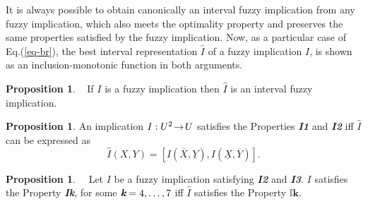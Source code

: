 \documentclass[conference]{IEEEtran}
\theoremstyle{plain}
\theoremstyle{remark}
\theoremstyle{definition}
\theoremstyle{proposition}
\newtheorem{proposition}[theorem]{Proposition}
\newcommand{\lra}{\hspace{-0.05cm}\rightarrow\hspace{-0.05cm}}
\newcommand{\II}{\mathbb{I} }
\begin{document}
It is always possible to obtain canonically an interval fuzzy implication from any fuzzy implication, which also meets the optimality property and preserves the same properties satisfied by the fuzzy
implication. Now, as a particular case of Eq.(\ref{eq-br}), the best interval representation $\widehat{I}$ of a fuzzy implication $I$, is shown as an inclusion-monotonic function in both arguments.

\begin{proposition}~\cite[Prop.~16]{Bed10b}
If $I$ is a fuzzy implication then $\widehat{I}$ is an interval
fuzzy implication.
\end{proposition}

\begin{proposition}\cite[Prop.~21]{Bed10b}\label{pro-char-cirI}
An implication $I: U^2 \lra U$ satisfies the Properties \emph{\textbf{I1}} and \emph{\textbf{I2}} iff $\widehat{I}$ can be expressed as\vspace{-0.1cm}
\begin{equation}\label{eq-int-i}
\widehat{I}(X,Y)= [I(\overline{X},\underline{Y}), I(\underline{X},\overline{Y})].
\end{equation}
\end{proposition}




\begin{proposition}~\cite[Prop.~23]{Bed10b}~\cite[Theorem~11]{BDR09}\label{cor-prop-int-imp}
Let $I$ be a fuzzy implication satisfying \emph{\textbf{I2}} and \emph{\textbf{I3}}. $I$ satisfies the Property
\emph{\textbf{Ik}}, for some $\emph{\textbf{k}}=4,\ldots,7$ iff $\widehat{I}$ satisfies the Property
$\II\mathbf{k}$.
\end{proposition}
\end{document}
